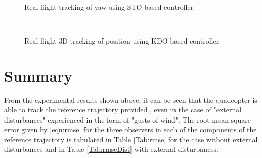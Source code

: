 \documentclass[letterpaper%
, twoside%
, 12pt%
,memoire%
, english%
,creativecommons,hyperref%
]{thETS}
\begin{document}
\begin{figure}[H]
	\centering
	 \\ \parbox{0.75\textwidth}{\caption{Real flight tracking of yaw using STO based controller\label{Fig:yawtracKDODist}}}
\end{figure}
\begin{figure}[H]
	\centering
	 \\ \parbox{0.75\textwidth}{\caption{Real flight 3D tracking of position using KDO based controller\label{Fig:3dKDODist}}}
\end{figure}
\FloatBarrier


\section{Summary}
From the experimental results shown above, it can be seen that the quadcopter is able to track the reference trajectory provided , even in the case of  "external disturbances" experienced in the form of "gusts of wind". The root-mean-square error given by \eqref{eqn:rmse} for the three observers in each of the components of the reference trajectory is tabulated in Table \ref{Tab:rmse} for the case without external disturbances and in Table \ref{Tab:rmseDist} with external disturbances. 
\end{document}
